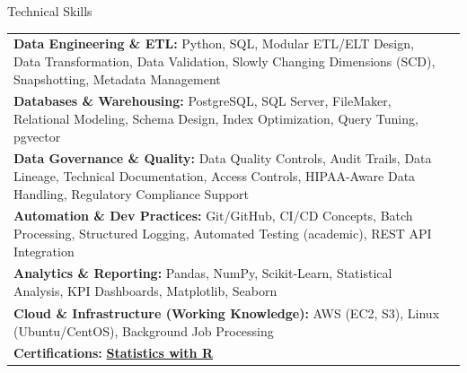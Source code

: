 \documentclass{resume}
\begin{document}
    \begin{rSection}{Technical Skills}
        \begin{tabular}{ @{} l @{\hspace{1ex}} l }
                                \textbf{Data Engineering \& ETL:} Python, SQL, Modular ETL/ELT Design, Data Transformation, Data Validation, Slowly Changing Dimensions (SCD), Snapshotting, Metadata Management\\
                                \textbf{Databases \& Warehousing:} PostgreSQL, SQL Server, FileMaker, Relational Modeling, Schema Design, Index Optimization, Query Tuning, pgvector\\
                                \textbf{Data Governance \& Quality:} Data Quality Controls, Audit Trails, Data Lineage, Technical Documentation, Access Controls, HIPAA-Aware Data Handling, Regulatory Compliance Support\\
                                \textbf{Automation \& Dev Practices:} Git/GitHub, CI/CD Concepts, Batch Processing, Structured Logging, Automated Testing (academic), REST API Integration\\
                                \textbf{Analytics \& Reporting:} Pandas, NumPy, Scikit-Learn, Statistical Analysis, KPI Dashboards, Matplotlib, Seaborn\\
                                \textbf{Cloud \& Infrastructure (Working Knowledge):} AWS (EC2, S3), Linux (Ubuntu/CentOS), Background Job Processing\\
                        \textbf{Certifications:} 
                                            \href{}{\textbf{Statistics with R}}\\
                                 
        \end{tabular}
    \end{rSection}
\end{document}
